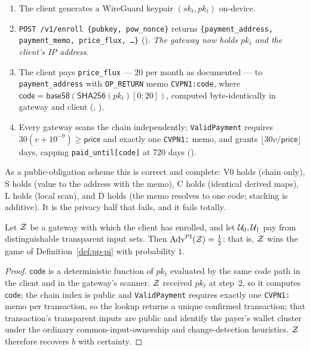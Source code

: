 \begin{enumerate}
  \item The client generates a WireGuard keypair $(sk_t, pk_t)$ on-device.
  \item \texttt{POST /v1/enroll \{pubkey, pow\_nonce\}} returns
    \texttt{\{payment\_address,\allowbreak{} payment\_memo,\allowbreak{} price\_flux,\allowbreak{} \dots\}}
    (). \emph{The gateway now holds
    $pk_t$ and the client's IP address.}
  \item The client pays \texttt{price\_flux} --- \num{20}\flux{} per month as documented --- to
    \texttt{payment\_address} with \texttt{OP\_RETURN} memo \texttt{CVPN1:code}, where
    $\mathsf{code} = \mathsf{base58}(\mathsf{SHA256}(pk_t)[0{:}20])$, computed byte-identically in
    gateway and client (,
    ).
  \item Every gateway scans the chain independently; \texttt{ValidPayment} requires
    $30(v + 10^{-9}) \ge \mathsf{price}$ and exactly one \texttt{CVPN1:} memo, and grants
    $\lfloor 30 v / \mathsf{price}\rfloor$ days, capping \texttt{paid\_until[code]} at \num{720} days
    ().
\end{enumerate}

As a public-obligation scheme this is correct and complete: V0 holds (chain only), S holds (value to
the address with the memo), C holds (identical derived maps), L holds (local scan), and D holds (the
memo resolves to one code; stacking is additive). It is the privacy half that fails, and it fails
totally.

\begin{property}
\label{prop:pp-cvpn}
Let $\mathcal{Z}$ be a gateway with which the client has enrolled, and let $\mathcal{U}_0,\mathcal{U}_1$ pay
from distinguishable transparent input sets. Then $\mathrm{Adv}^{\mathrm{PI}}(\mathcal{Z}) = \tfrac12$; that
is, $\mathcal{Z}$ wins the game of Definition~\ref{def:pp-pi} with probability $1$.
\end{property}

\begin{proof}
$\mathsf{code}$ is a deterministic function of $pk_t$ evaluated by the same code path in the client
and in the gateway's scanner. $\mathcal{Z}$ received $pk_t$ at step~2, so it computes $\mathsf{code}$; the
chain index is public and \texttt{ValidPayment} requires exactly one \texttt{CVPN1:} memo per
transaction, so the lookup returns a unique confirmed transaction; that transaction's transparent
inputs are public and identify the payer's wallet cluster under the ordinary common-input-ownership
and change-detection heuristics. $\mathcal{Z}$ therefore recovers $b$ with certainty.
\end{proof}

